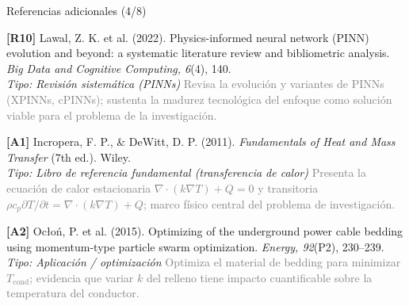 \documentclass[aspectratio=169]{beamer}
\begin{document}
\begin{frame}{Referencias adicionales (4/8)}
\small\justifying

\textbf{[R10]} Lawal, Z. K. et al. (2022). Physics-informed neural network
(PINN) evolution and beyond: a systematic literature review and bibliometric
analysis. \textit{Big Data and Cognitive Computing, 6}(4), 140.\\
\textcolor{blue!60!black}{\footnotesize\textit{Tipo: Revisión sistemática (PINNs)}} \quad
\textcolor{gray}{\footnotesize Revisa la evolución y variantes de PINNs
(XPINNs, cPINNs); sustenta la madurez tecnológica del enfoque como solución
viable para el problema de la investigación.}

\medskip
\textbf{[A1]} Incropera, F. P., \& DeWitt, D. P. (2011). \textit{Fundamentals
of Heat and Mass Transfer} (7th ed.). Wiley.\\
\textcolor{purple!70!black}{\footnotesize\textit{Tipo: Libro de referencia fundamental (transferencia de calor)}} \quad
\textcolor{gray}{\footnotesize Presenta la ecuación de calor estacionaria
$\nabla\cdot(k\nabla T)+Q=0$ y transitoria $\rho c_p \partial T/\partial t =
\nabla\cdot(k\nabla T)+Q$; marco físico central del problema de investigación.}

\medskip
\textbf{[A2]} Ocłoń, P. et al. (2015). Optimizing of the underground power
cable bedding using momentum-type particle swarm optimization. \textit{Energy,
92}(P2), 230--239.\\
\textcolor{purple!70!black}{\footnotesize\textit{Tipo: Aplicación / optimización}} \quad
\textcolor{gray}{\footnotesize Optimiza el material de bedding para minimizar
$T_{\text{cond}}$; evidencia que variar $k$ del relleno tiene impacto
cuantificable sobre la temperatura del conductor.}
\end{frame}
\end{document}
